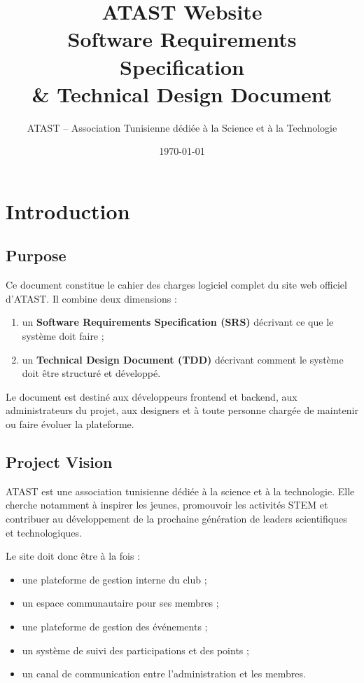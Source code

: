 \documentclass[11pt,a4paper]{report}
\title{\textbf{ATAST Website}\\
Software Requirements Specification\\
\& Technical Design Document}
\author{ATAST -- Association Tunisienne dédiée à la Science et à la Technologie}
\date{\today}
\begin{document}
\maketitle
\tableofcontents
\listoftables
\clearpage

\chapter{Introduction}

\section{Purpose}

Ce document constitue le cahier des charges logiciel complet du site web officiel d'ATAST. Il combine deux dimensions :

\begin{enumerate}
    \item un \textbf{Software Requirements Specification (SRS)} décrivant ce que le système doit faire ;
    \item un \textbf{Technical Design Document (TDD)} décrivant comment le système doit être structuré et développé.
\end{enumerate}

Le document est destiné aux développeurs frontend et backend, aux administrateurs du projet, aux designers et à toute personne chargée de maintenir ou faire évoluer la plateforme.

\section{Project Vision}

ATAST est une association tunisienne dédiée à la science et à la technologie. Elle cherche notamment à inspirer les jeunes, promouvoir les activités STEM et contribuer au développement de la prochaine génération de leaders scientifiques et technologiques.

Le site doit donc être à la fois :

\begin{itemize}
    \item une plateforme de gestion interne du club ;
    \item un espace communautaire pour ses membres ;
    \item une plateforme de gestion des événements ;
    \item un système de suivi des participations et des points ;
    \item un canal de communication entre l'administration et les membres.
\end{itemize}
\end{document}
